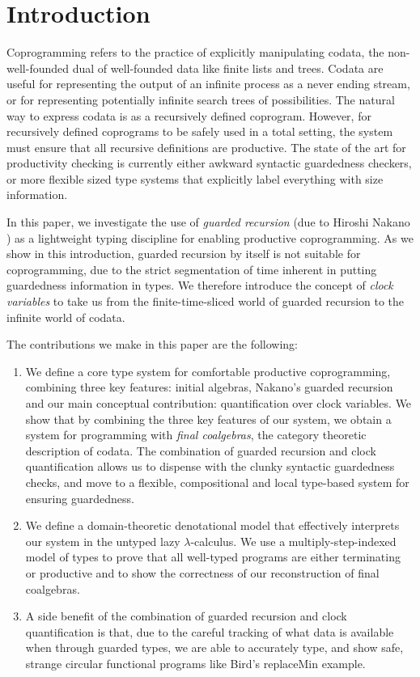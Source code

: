 \section{Introduction}
\label{sec:introduction}

Coprogramming refers to the practice of explicitly manipulating
codata, the non-well-founded dual of well-founded data like finite
lists and trees. Codata are useful for representing the output of an
infinite process as a never ending stream, or for representing
potentially infinite search trees of possibilities. The natural way to
express codata is as a recursively defined coprogram. However, for
recursively defined coprograms to be safely used in a total setting,
the system must ensure that all recursive definitions are
productive. The state of the art for productivity checking is
currently either awkward syntactic guardedness checkers, or more
flexible sized type systems that explicitly label everything with size
information.

In this paper, we investigate the use of \emph{guarded recursion} (due
to Hiroshi Nakano \cite{nakano00modality}) as a lightweight typing
discipline for enabling productive coprogramming. As we show in this
introduction, guarded recursion by itself is not suitable for
coprogramming, due to the strict segmentation of time inherent in
putting guardedness information in types. We therefore introduce the
concept of \emph{clock variables} to take us from the
finite-time-sliced world of guarded recursion to the infinite world of
codata.

The contributions we make in this paper are the following:
\begin{enumerate}
\item We define a core type system for comfortable productive
  coprogramming, combining three key features: initial algebras,
  Nakano's guarded recursion and our main conceptual contribution:
  quantification over clock variables. We show that by combining the
  three key features of our system, we obtain a system for programming
  with \emph{final coalgebras}, the category theoretic description of
  codata. The combination of guarded recursion and clock
  quantification allows us to dispense with the clunky syntactic
  guardedness checks, and move to a flexible, compositional and
  local type-based system for ensuring guardedness.
\item We define a domain-theoretic denotational model that effectively
  interprets our system in the untyped lazy $\lambda$-calculus. We use
  a multiply-step-indexed model of types to prove that all well-typed
  programs are either terminating or productive and to show the
  correctness of our reconstruction of final coalgebras.
\item A side benefit of the combination of guarded recursion and clock
  quantification is that, due to the careful tracking of what data is
  available when through guarded types, we are able to accurately
  type, and show safe, strange circular functional programs like
  Bird's replaceMin example.
\end{enumerate}

